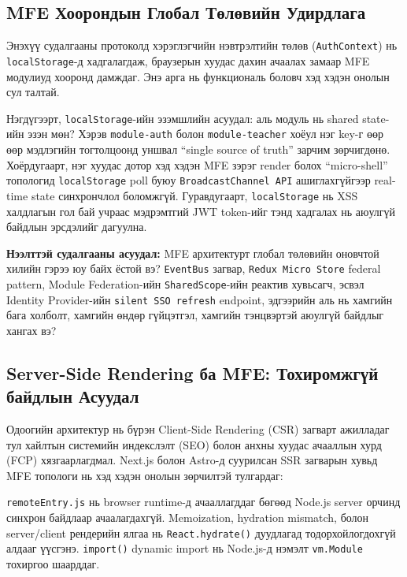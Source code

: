 \subsection{MFE Хоорондын Глобал Төлөвийн Удирдлага}

Энэхүү судалгааны протоколд хэрэглэгчийн нэвтрэлтийн төлөв
(\texttt{AuthContext}) нь \texttt{localStorage}-д хадгалагдаж, браузерын
хуудас дахин ачаалах замаар MFE модулиуд хооронд дамждаг. Энэ арга нь
функциональ боловч хэд хэдэн онолын сул талтай.

Нэгдүгээрт, \texttt{localStorage}-ийн эзэмшлийн асуудал: аль модуль нь
shared state-ийн эзэн мөн? Хэрэв \texttt{module-auth} болон
\texttt{module-teacher} хоёул нэг key-г өөр өөр мэдлэгийн тогтолцоонд
уншвал ``single source of truth'' зарчим зөрчигдөнө. Хоёрдугаарт, нэг
хуудас дотор хэд хэдэн MFE зэрэг render болох ``micro-shell'' топологид
\texttt{localStorage} poll буюу \texttt{BroadcastChannel API} ашиглахгүйгээр
real-time state синхрончлол боломжгүй. Гуравдугаарт,
\texttt{localStorage} нь XSS халдлагын гол бай учраас мэдрэмтгий JWT
token-ийг тэнд хадгалах нь аюулгүй байдлын эрсдэлийг дагуулна.

\textbf{Нээлттэй судалгааны асуудал:} MFE архитектурт глобал төлөвийн
оновчтой хилийн гэрээ юу байх ёстой вэ? \texttt{EventBus} загвар,
\texttt{Redux Micro Store} federal pattern, Module Federation-ийн
\texttt{SharedScope}-ийн реактив хувьсагч, эсвэл Identity Provider-ийн
\texttt{silent SSO refresh} endpoint, эдгээрийн аль нь хамгийн бага
холболт, хамгийн өндөр гүйцэтгэл, хамгийн тэнцвэртэй аюулгүй байдлыг
хангах вэ?

\subsection{Server-Side Rendering ба MFE: Тохиромжгүй байдлын Асуудал}

Одоогийн архитектур нь бүрэн Client-Side Rendering (CSR) загварт ажилладаг
тул хайлтын системийн индекслэлт (SEO) болон анхны хуудас ачааллын хурд
(FCP) хязгаарлагдмал. Next.js болон Astro-д суурилсан SSR загварын
хувьд MFE топологи нь хэд хэдэн онолын зөрчилтэй тулгардаг:

\texttt{remoteEntry.js} нь browser runtime-д ачааллагддаг бөгөөд Node.js
server орчинд синхрон байдлаар ачаалагдахгүй. Memoization, hydration
mismatch, болон server/client рендерийн ялгаа нь \texttt{React.hydrate()}
дуудлагад тодорхойлогдохгүй алдааг үүсгэнэ. \texttt{import()} dynamic
import нь Node.js-д нэмэлт \texttt{vm.Module} тохиргоо шаарддаг.

